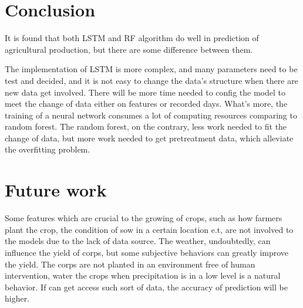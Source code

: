 \documentclass[conference]{IEEEtran}
\begin{document}
\section{Conclusion} \label{sec:con}
It is found that both LSTM and RF algorithm do well in prediction of agricultural production, but there are some difference between them.

The implementation of LSTM is more complex, and many parameters need to be test and decided, and it is not easy to change the data's structure when there are new data get involved. There will be more time needed to config the model to meet the change of data either on features or recorded days. What's more, the training of a neural network consumes a lot of computing resources comparing to random forest. The random forest, on the contrary, less work needed to fit the change of data, but more work needed to get pretreatment data, which alleviate the overfitting problem.

\section{Future work} \label{sec:fw}
Some features which are crucial to the growing of crops, such as how farmers plant the crop, the condition of sow in a certain location e.t, are not involved to the models due to the lack of data source. The weather, undoubtedly, can influence the yield of corps, but some subjective behaviors can greatly improve the yield. The corps are not planted in an environment free of human intervention, water the crops when precipitation is in a low level is a natural behavior. If can get access such sort of data, the accuracy of prediction will be higher. 



\end{document}
